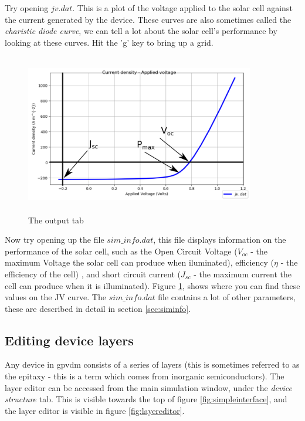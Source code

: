 Try opening $jv.dat$. This is a plot of the voltage applied to the solar cell against the current generated by the device.  These curves are also sometimes called the \emph{charistic diode curve}, we can tell a lot about the solar cell's performance by looking at these curves.  Hit the 'g' key to bring up a grid.

\begin{figure}[H]
\centering
\includegraphics[width=100mm,height=70mm]{./images/jv_curve.png}
\caption{The output tab}
\label{fig:jv_curve}
\end{figure}


Now try opening up the file $sim\_info.dat$, this file displays information on the performance of the solar cell, such as the Open Circuit Voltage ($V_{oc}$ - the maximum Voltage the solar cell can produce when iluminated), efficiency ($\eta$ - the efficiency of the cell) , and short circuit current ($J_{sc}$ - the maximum current the cell can produce when it is illuminated).  Figure \ref{fig:jv_curve}, shows where you can find these values on the JV curve.  The $sim\_info.dat$ file contains a lot of other parameters, these are described in detail in section \ref{sec:siminfo}.

\newpage
\subsection{Editing device layers}
\label{sec:layereditor}
Any device in gpvdm consists of a series of layers (this is sometimes referred to as the epitaxy - this is a term which comes from inorganic semiconductors). The layer editor can be accessed from the main simulation window, under the \emph{device structure} tab. This is visible towards the top of figure \ref{fig:simpleinterface}, and the layer editor is visible in figure \ref{fig:layereditor}.



